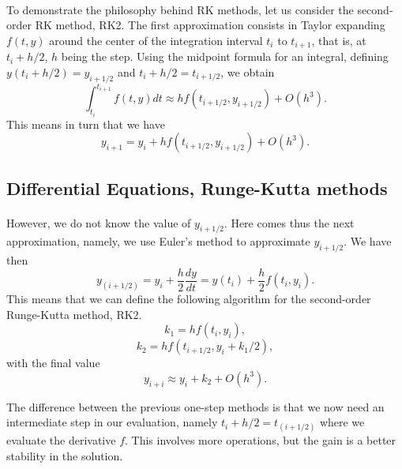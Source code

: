 \documentclass[%
oneside,                 %
final,                   %
10pt]{article}
\begin{document}
\paragraph{}
To demonstrate the philosophy behind RK methods, let us consider
the second-order RK method, RK2.
The first approximation consists in Taylor expanding $f(t,y)$
around the center of the integration interval $t_i$ to $t_{i+1}$,
that is, at $t_i+h/2$, $h$ being the step.
Using the midpoint formula for an integral, 
defining $y(t_i+h/2) = y_{i+1/2}$ and   
$t_i+h/2 = t_{i+1/2}$, we obtain
\begin{equation}
    \int_{t_i}^{t_{i+1}} f(t,y) dt \approx hf(t_{i+1/2},y_{i+1/2}) +O(h^3).
\end{equation} 
This means in turn that we have
\begin{equation}
     y_{i+1}=y_i + hf(t_{i+1/2},y_{i+1/2}) +O(h^3).
\end{equation}





\subsection{Differential Equations, Runge-Kutta methods}

\paragraph{}
However, we do not know the value of   $y_{i+1/2}$. Here comes thus the next approximation, namely, we use Euler's
method to approximate $y_{i+1/2}$. We have then
\begin{equation}
   y_{(i+1/2)}=y_i + \frac{h}{2}\frac{dy}{dt} =
   y(t_i) + \frac{h}{2}f(t_i,y_i).
\end{equation}
This means that we can define the following algorithm for 
the second-order Runge-Kutta method, RK2.
\begin{equation} 
  k_1=hf(t_i,y_i),
\end{equation} 
\begin{equation}
  k_2=hf(t_{i+1/2},y_i+k_1/2),
\end{equation}
with the final value
\begin{equation} 
  y_{i+i}\approx y_i + k_2 +O(h^3). 
\end{equation}

The difference between the previous one-step methods 
is that we now need an intermediate step in our evaluation,
namely $t_i+h/2 = t_{(i+1/2)}$ where we evaluate the derivative $f$. 
This involves more operations, but the gain is a better stability
in the solution.
\end{document}
